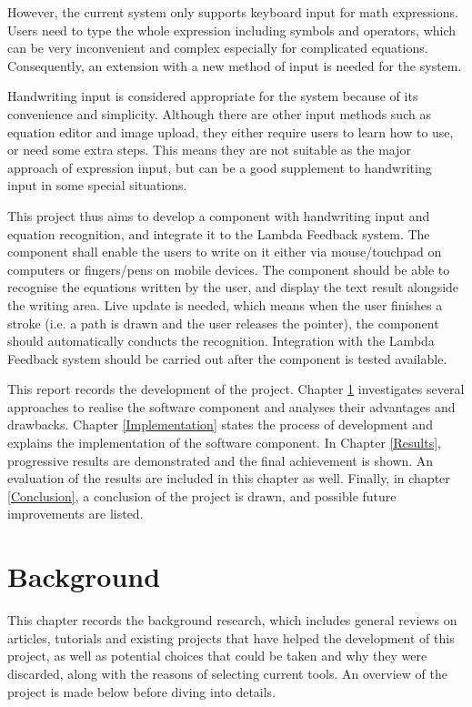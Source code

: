 \documentclass[12pt,twoside]{report}
\begin{document}
However, the current system only supports keyboard input for math expressions.
Users need to type the whole expression including symbols and operators, which
can be very inconvenient and complex especially for complicated equations.
Consequently, an extension with a new method of input is needed for the system.

Handwriting input is considered appropriate for the system because of its
convenience and simplicity. Although there are other input methods such as
equation editor and image upload, they either require users to learn how to use,
or need some extra steps. This means they are not suitable as the major approach
of expression input, but can be a good supplement to handwriting input in some
special situations.

This project thus aims to develop a component with handwriting input and
equation recognition, and integrate it to the Lambda Feedback system. The
component shall enable the users to write on it either via mouse/touchpad on
computers or fingers/pens on mobile devices. The component should be able to
recognise the equations written by the user, and display the text result
alongside the writing area. Live update is needed, which means when the user
finishes a stroke (i.e. a path is drawn and the user releases the pointer), the
component should automatically conducts the recognition. Integration with the
Lambda Feedback system should be carried out after the component is tested
available.

This report records the development of the project. Chapter \ref{Background}
investigates several approaches to realise the software component and analyses
their advantages and drawbacks. Chapter \ref{Implementation} states the process
of development and explains the implementation of the software component. In
Chapter \ref{Results}, progressive results are demonstrated and the final
achievement is shown. An evaluation of the results are included in this chapter
as well. Finally, in chapter \ref{Conclusion}, a conclusion of the project is drawn, and possible future improvements are listed.



\chapter{Background}
\label{Background}

This chapter records the background research, which includes general reviews on
articles, tutorials and existing projects that have helped the development of
this project, as well as potential choices that could be taken and why they were
discarded, along with the reasons of selecting current tools. An overview of the project is made below before diving into details.
\end{document}
